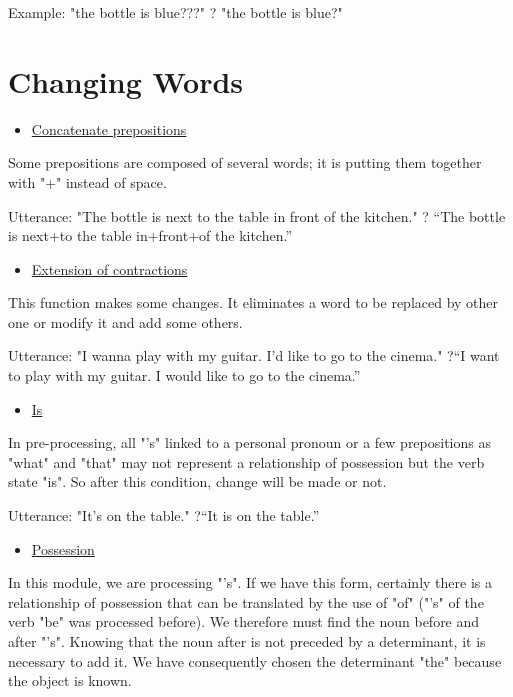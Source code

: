 \documentclass[twoside,a4paper,10pt]{report}
\newcommand{\dokutitleleveltree}[1]{\section{#1}}
\newcommand{\dokuunderline}[1]{\underline{#1}}
\newcommand{\dokuitem}{\item}
\begin{document}
Example: "the bottle is blue???" ? "the bottle is blue?"


\dokutitleleveltree{Changing Words}
\label{179d018d9e72e2699a66b97a27313146}%

\begin{itemize}
\dokuitem  \dokuunderline{Concatenate prepositions}
\end{itemize}
Some prepositions are composed of several words; it is putting them together with "+" instead of space.


\small
\begin{verbatimtab}
  Utterance: "The bottle is next to the table in front of the kitchen."
  ? “The bottle is next+to the table in+front+of the kitchen.”
\end{verbatimtab}
\normalsize

\begin{itemize}
\dokuitem  \dokuunderline{Extension of contractions}
\end{itemize}
This function makes some changes. It eliminates a word to be replaced by other one or modify it and add some others.


\small
\begin{verbatimtab}
  Utterance: "I wanna play with my guitar. I'd like to go to the cinema."
  ?“I want to play with my guitar. I would like to go to the cinema.”
\end{verbatimtab}
\normalsize

\begin{itemize}
\dokuitem  \dokuunderline{Is}
\end{itemize}
In pre-processing, all "’s" linked to a personal pronoun or a few prepositions as "what" and "that" may not represent a relationship of possession but the verb state "is". So after this condition, change will be made or not.


\small
\begin{verbatimtab}
  Utterance: "It's on the table."
  ?“It is on the table.” 
\end{verbatimtab}
\normalsize

\begin{itemize}
\dokuitem  \dokuunderline{Possession}
\end{itemize}
In this module, we are processing "’s". If we have this form, certainly there is a relationship of possession that can be translated by the use of "of" ("’s" of the verb "be" was processed before). We therefore must find the noun before and after "’s". Knowing that the noun after is not preceded by a determinant, it is necessary to add it. We have consequently chosen the determinant "the" because the object is known.
\end{document}
